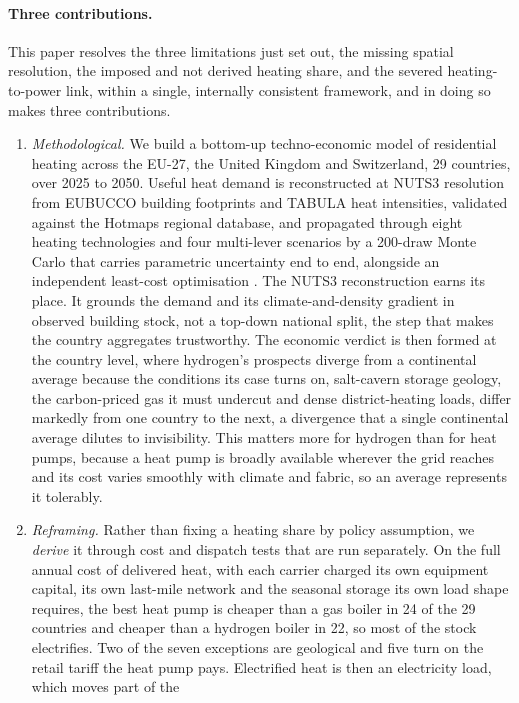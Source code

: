 \paragraph{Three contributions.}
This paper resolves the three limitations just set out, the missing spatial
resolution, the imposed and not derived heating share, and the severed
heating-to-power link, within a single, internally consistent framework, and in
doing so makes three contributions.
\begin{enumerate}
  \item \emph{Methodological.} We build a bottom-up
  techno-economic model of residential heating across the EU-27, the United Kingdom
  and Switzerland, 29 countries, over 2025 to 2050.
  Useful heat demand is reconstructed at NUTS3 resolution from EUBUCCO building footprints and TABULA
  heat intensities, validated against the Hotmaps regional database, and propagated
  through eight heating technologies and four multi-lever scenarios by a 200-draw
  Monte Carlo that carries parametric uncertainty end to end, alongside an
  independent least-cost optimisation \citep{MilojevicDupont2023Eubucco,Loga2016Tabula}. The NUTS3 reconstruction earns its place. It grounds the demand and its climate-and-density gradient in observed building stock, not a top-down national split, the step that makes the country aggregates trustworthy.
  The economic verdict is then formed at the country level, where hydrogen's prospects
  diverge from a continental average because the conditions its case turns on, salt-cavern
  storage geology, the carbon-priced gas it must undercut and dense district-heating
  loads, differ markedly from one country to the next, a divergence that a single
  continental average dilutes to invisibility. This matters more for hydrogen than for
  heat pumps, because a heat pump is broadly available wherever the grid reaches and its
  cost varies smoothly with climate and fabric, so an average represents it tolerably.
  \item \emph{Reframing.} Rather than fixing a heating share by policy assumption,
  we \emph{derive} it through cost and dispatch tests that are run separately. On the full annual cost of delivered heat, with each carrier charged its own equipment
capital, its own last-mile network and the seasonal storage its own load shape requires,
the best heat pump is cheaper than a gas boiler in 24 of the 29 countries and cheaper
than a hydrogen boiler in 22, so most of the stock electrifies. Two of the seven
exceptions are geological and five turn on the retail tariff the heat pump pays. Electrified heat is then an electricity load, which moves part of the

\end{enumerate}
